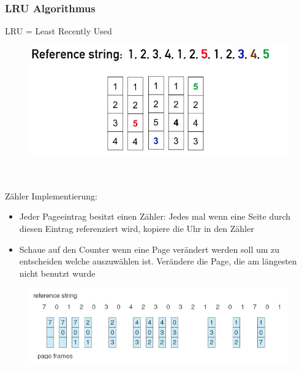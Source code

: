 \documentclass[a4paper]{scrreprt}
\begin{document}
\subsubsection{LRU Algorithmus}
LRU = Least Recently Used
\begin{figure}[ht]
\centering
\includegraphics[scale=0.5]{graphics/referencestring.png}
\end{figure}
\ \\ \ \\
Zähler Implementierung:
\begin{itemize}
\item Jeder Pageeintrag besitzt einen Zähler: Jedes mal wenn eine Seite durch diesen Eintrag referenziert wird, kopiere die Uhr in den Zähler
\item Schaue auf den Counter wenn eine Page verändert werden soll um zu entscheiden welche auszuwählen ist. Verändere die Page, die am längesten nicht benutzt wurde

\end{itemize}



\begin{figure}[ht]
\centering
\includegraphics[scale=0.5]{graphics/LRU.png}
\end{figure}
\end{document}
